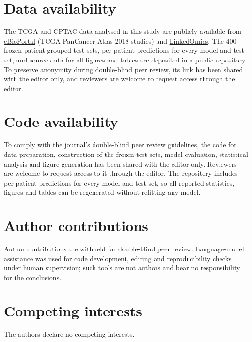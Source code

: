 \documentclass[pdflatex,sn-nature]{sn-jnl}
\begin{document}
\section*{Data availability}
The TCGA and CPTAC data analysed in this study are publicly available from \href{https://www.cbioportal.org}{cBioPortal} (TCGA PanCancer Atlas 2018 studies) and \href{https://www.linkedomics.org}{LinkedOmics}. The 400 frozen patient-grouped test sets, per-patient predictions for every model and test set, and source data for all figures and tables are deposited in a public repository. To preserve anonymity during double-blind peer review, its link has been shared with the editor only, and reviewers are welcome to request access through the editor.

\section*{Code availability}
To comply with the journal's double-blind peer review guidelines, the code for data preparation, construction of the frozen test sets, model evaluation, statistical analysis and figure generation has been shared with the editor only. Reviewers are welcome to request access to it through the editor. The repository includes per-patient predictions for every model and test set, so all reported statistics, figures and tables can be regenerated without refitting any model.

\section*{Author contributions}
Author contributions are withheld for double-blind peer review. Language-model assistance was used for code development, editing and reproducibility checks under human supervision; such tools are not authors and bear no responsibility for the conclusions.

\section*{Competing interests}
The authors declare no competing interests.
\end{document}
